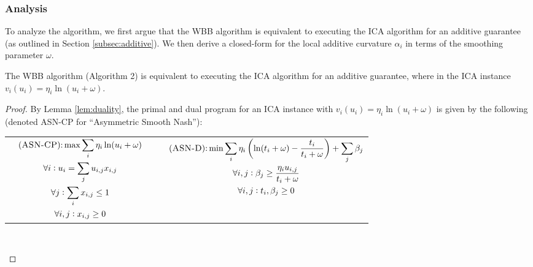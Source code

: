 \subsubsection{Analysis}
To analyze the algorithm, we first argue that the WBB algorithm is equivalent to executing the ICA algorithm for an additive guarantee (as outlined in Section \ref{subsec:additive}). We then derive a closed-form for the local additive curvature $\alpha_i$ in terms of the smoothing parameter $\omega$.

\begin{lemma} 
The WBB algorithm (Algorithm 2) is equivalent to executing the ICA algorithm for an additive guarantee, where in the ICA instance $v_i(u_i) = \eta_i \ln(u_i + \omega)$.
\end{lemma} 

\begin{proof} 
By Lemma \ref{lem:duality}, the  primal and dual program for an ICA instance with $v_i(u_i) = \eta_i \ln(u_i + \omega)$ is given by the following (denoted {\sc ASN-CP} for ``Asymmetric Smooth Nash''):  

\begin{center}
\begin{tabular}{c  c  c | c  c} 
\hspace{5mm} & 
$
\begin{gathered}
    \textnormal{({\sc ASN-CP}):}  \max \sum_i \eta_i\ln(u_i+\omega) \\
    \forall i: u_i = \sum_j u_{i,j}x_{i,j} \\
    \forall j: \sum_i x_{i,j} \leq 1 \\
    \forall i,j: x_{i,j} \geq 0 \\
\end{gathered}
$
& \hspace{1mm} & \hspace{1mm} & 
\vspace{-4mm}
$
\begin{gathered}
    \textnormal{({\sc ASN-D}):} \min \sum_i \eta_i \left(\ln(t_i+ \omega) - \frac{t_i}{t_i+\omega}\right) + \sum_j \beta_j \\
    \forall i,j: \beta_j \geq \frac{\eta_i u_{i,j}}{t_i + \omega} \\
    \forall i,j: t_i, \beta_j \geq 0 \\
\end{gathered}
$
\end{tabular} \\
\end{center} 
\vspace{5mm}



\end{proof}
